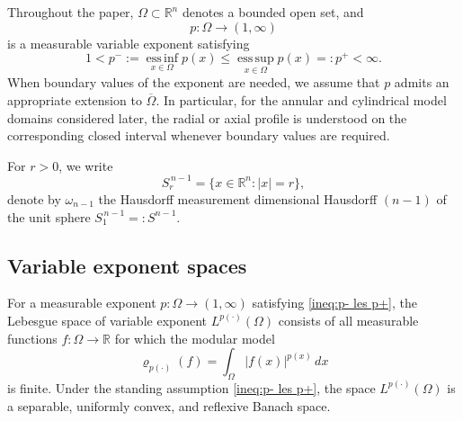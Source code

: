 \documentclass[12pt]{amsart}
\numberwithin{equation}{section}
\theoremstyle{plain}
\theoremstyle{definition}
\begin{document}
Throughout the paper, $\Omega\subset\mathbb{R}^n$ denotes a bounded
open set, and
\begin{equation*}
p:\Omega\longrightarrow(1,\infty)
\end{equation*}
is a measurable variable exponent satisfying
\begin{equation}\label{ineq:p- les p+}
1<p^-:=
\operatorname*{ess\,inf}_{x\in\Omega}p(x)
\le
\operatorname*{ess\,sup}_{x\in\Omega}p(x)
=:p^+
<\infty.
\end{equation}
When boundary values of the exponent are needed, we assume that $p$
admits an appropriate extension to $\overline{\Omega}$. In particular,
for the annular and cylindrical model domains considered later, the
radial or axial profile is understood on the corresponding closed
interval whenever boundary values are required.

For $r>0$, we write
\begin{equation*}
S_r^{\,n-1}
=
\{x\in\mathbb{R}^n:|x|=r\},
\end{equation*}
denote by $\omega_{n-1}$ the Hausdorff measurement dimensional Hausdorff $(n-1)$
of the unit sphere $S_1^{\,n-1}=:S^{n-1}$.

\subsection{Variable exponent spaces}

For a measurable exponent
$p:\Omega\longrightarrow(1,\infty)
$
satisfying \eqref{ineq:p- les p+}, the Lebesgue space of variable exponent $L^{p(\cdot)}(\Omega)$ consists
of all measurable functions
$f:\Omega\to\mathbb{R}$ for which the modular model
\begin{equation*}
\varrho_{p(\cdot)}(f)
=
\int_\Omega |f(x)|^{p(x)}\,dx
\end{equation*}
is finite.
Under the standing assumption \eqref{ineq:p- les p+},
the space $L^{p(\cdot)}(\Omega)$ is a separable, uniformly convex, and
reflexive Banach space.
\end{document}
